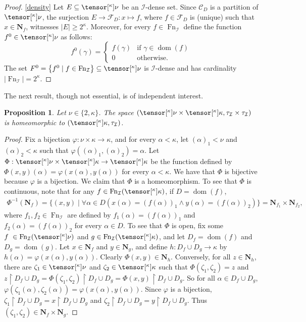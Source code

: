 \documentclass{amsart}
\numberwithin{equation}{section}
\newcommand{\C}{\mathcal{C}}
\newcommand{\F}{\mathcal{F}}
\newcommand{\I}{\mathcal{I}}
\newcommand{\pre}[2]{\tensor[^{#1}]{#2}{}}
\newcommand{\Nbhd}{\boldsymbol{N}}
\newcommand{\1}{\mathbf{I}}
\newcommand{\2}{\mathbf{II}}
\renewcommand{\a}{\alpha}
\renewcommand{\k}{\kappa}
\renewcommand{\phi}{\varphi}
\DeclareMathOperator{\dom}{dom}
\DeclareMathOperator{\Fn}{Fn}
\newcommand{\clopen}[1]{\Nbhd_{#1}}
\newtheorem{proposition}[theorem]{Proposition}
\theoremstyle{definition}
\theoremstyle{remark}
\begin{document}
\begin{proof}
    \ref{density} Let \(E \subseteq \pre{\k}{\nu}\) be an \(\I\)-dense set. Since \(\C_D \) is a partition of \(\pre{\k}{\nu}\), the surjection
 \( E\rightarrow \F_D: x \mapsto f \), where  \(f \in \F_D\) is (unique) such that \(x \in \clopen{f}\), witnesses \(|E|\geq 2^\k\). Moreover, for every $f\in \Fn_\I$ define the function $f^0\in \pre{\k}{\nu}$ as follows: $$f^0(\gamma)=\begin{cases} f(\gamma) &\mbox{if }\gamma\in \dom(f)\\
    0 & 
    \text{otherwise.}\end{cases}$$  
 The set \(F^0=\left\lbrace f^0\mid f \in \Fn_\I \right\rbrace \subseteq \pre{\k}{\nu}\) 
  is \(\I\)-dense and has cardinality \(|\Fn_\I|=2^\k\). 
\end{proof}


The next result, though not essential, is of independent interest.
\begin{proposition}
\label{lemma:homeo}
Let \(\nu \in \{2,\k\}\). 
The space \((\pre{\k}{\nu} \times \pre{\k}{\k}, \tau_\I \times \tau_\I)\) is homeomorphic to %
   \((\pre{\k}{\k}, \tau_\I)\).
\end{proposition}
\begin{proof}
     Fix a bijection \(\varphi : \nu \times \k \to \k\), and for every \(\a<\k\), let \((\a)_1<\nu\) and \((\a)_2<\k\) such that \(\phi((\a)_1,(\a)_2)=\a\).
     Let 
    \(
    \Phi:\pre{\k}{\nu} \times \pre{\k}{\k} \to \pre{\k}{\k}
    \) be the function defined by \(  \Phi(x,y)(\a)= \varphi(x(\a),y(\a))\) for every \(\a<\k\).
    We have that \(  \Phi\) is bijective because \(\varphi\) is a bijection. We claim that $\Phi$ is a homeomorphism.
    To see that \(  \Phi\) is continuous, note that for any \(f \in \Fn_\I(\pre{\k}{\k}) \), if \(D=\dom(f)\),
    \begin{align*}
    \Phi^{-1}(\clopen{f})=\{(x,y) \mid \forall \a\in D  \left( x(\a)= (f(\a))_1 \wedge y(\a)=(f(\a))_2\right)\}
    = \clopen{f_1}\times \clopen{f_2},
    \end{align*}
where \(f_1, f_2 \in \Fn_\I\) are defined by \(f_1(\a)=(f(\a))_1\) and \(f_2(\a)=(f(\a))_2\) for every \(\a \in D\).
To see that \(\Phi\) is open, fix some \(f \ \in \Fn_\I(\pre{\k}{\nu})\) and \(g  \in \Fn_\I(\pre{\k}{\k})\), and let \(D_f=\dom(f)\) and \(D_g=\dom(g)\).  Let $x \in \clopen{f}$ and $y \in \clopen{g}$, and define \(h: D_f \cup D_g \to \k \)  by \(h(\a)=\varphi(x(\a),y(\a))\). Clearly $\Phi(x,y)\in \clopen{h}$. Conversely, for all $z\in \clopen{h}$, there are $\zeta_1 \in \pre{\k}{\nu}$ and $\zeta_2 \in \pre{\k}{\k}$ such that $\Phi(\zeta_1,\zeta_2)=z$ and $z\restriction D_f \cup D_g=\Phi(\zeta_1,\zeta_2)\restriction D_f \cup D_g=\Phi(x,y)\restriction D_f \cup D_g$. So for all $\alpha\in D_f\cup D_g$, $\varphi(\zeta_1(\alpha),\zeta_2(\alpha))=\varphi(x(\alpha),y(\alpha))$. Since $\varphi$ is a bijection, $\zeta_1\restriction D_f\cup D_g=x\restriction D_f\cup D_g$ and $\zeta_2\restriction D_f\cup D_g=y\restriction D_f\cup D_g$. Thus $(\zeta_1,\zeta_2)\in \clopen{f}\times\clopen{g}$.
 
\end{proof}
\end{document}
